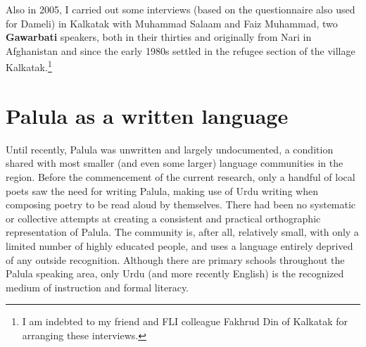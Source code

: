 Also in 2005, I carried out some interviews (based on the questionnaire also used for Dameli) in Kalkatak with Muhammad Salaam and Faiz Muhammad, two \textbf{Gawarbati} speakers, both in their thirties and originally from Nari in Afghanistan and since the early 1980s settled in the refugee section of the village Kalkatak.\footnote{I am indebted to my friend and FLI colleague Fakhrud Din of Kalkatak for arranging these interviews.}


\section{Palula as a written language}
\label{sec:1-6b}

Until recently, Palula was unwritten and largely undocumented, a condition shared with most smaller (and even some larger) language communities in the region. Before the commencement of the current research, only a handful of local poets saw the need for writing Palula, making use of Urdu writing when composing poetry to be read aloud by themselves. There had been no systematic or collective attempts at creating a consistent and practical orthographic representation of Palula. The community is, after all, relatively small, with only a limited number of highly educated people, and uses a language entirely deprived of any outside recognition. Although there are primary schools throughout the Palula speaking area, only Urdu (and more recently English) is the recognized medium of instruction and formal literacy.


